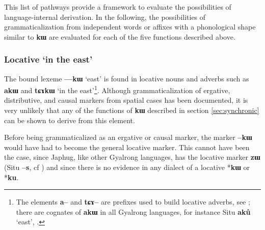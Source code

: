 \documentclass[oldfontcommands,oneside,a4paper,11pt]{article}
\newcommand{\ipa}[1]{{\phon\textbf{#1}}}
\begin{document}
\begin{table}[H]
\caption{Attested historical origins of functions expressed with \ipa{kɯ}} \centering \label{tab:origins}
\end{table}

This list of pathways provide a framework to evaluate the possibilities of language-internal derivation. In the following, the possibilities of grammaticalization from independent words or affixes with a phonological shape similar to \ipa{kɯ} are evaluated for each of the five functions described above.
 
\subsubsection{Locative `in the east'}
The bound lexeme \ipa{---kɯ}  `east' is found in locative nouns and adverbs such as \ipa{akɯ} and  \ipa{tɕɤkɯ} `in the east'\footnote{The elements \ipa{a--} and \ipa{tɕɤ--} are prefixes used to build locative adverbs, see \citealt[162]{linxr93jiarong}; there are cognates of  \ipa{akɯ} in all Gyalrong languages, for instance Situ \ipa{akû} `east', \citealt[29]{lin02dimension}.}. Although grammaticalization of ergative, distributive, and causal  markers  from spatial cases has been documented, it is very unlikely that any of the functions of \ipa{kɯ} described in section  \ref{sec:synchronic} can be shown to derive from this element. 

Before being grammaticalized as an ergative or causal marker, the marker \ipa{--kɯ} would have had to become the general locative marker. This cannot have been the case, since Japhug, like other Gyalrong languages, has the locative marker \ipa{zɯ} (Situ \ipa{--s}, cf \citealt[330-336]{linxr93jiarong}) and since there is no evidence in any dialect of a locative *\ipa{kɯ} or *\ipa{ku}.
\end{document}
